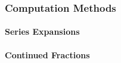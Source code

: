 



\subsubsection{Computation Methods}

\paragraph{Series Expansions}

\paragraph{Continued Fractions}





